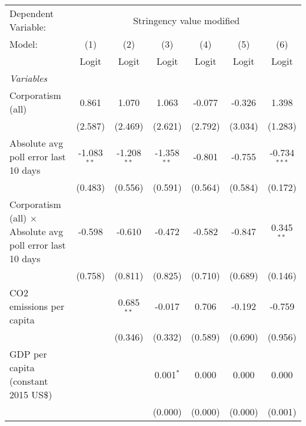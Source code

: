 
\begingroup
\centering
\begin{tabular}{lcccccc}
   \toprule
   Dependent Variable: & \multicolumn{6}{c}{Stringency value modified}\\
   Model:                                                           & (1)           & (2)           & (3)           & (4)          & (5)             & (6)\\  
                                                                    &  Logit        & Logit         & Logit         & Logit        & Logit           & Logit\\  
   \midrule
   \emph{Variables}\\
   Corporatism (all)                                                & 0.861         & 1.070         & 1.063         & -0.077       & -0.326          & 1.398\\   
                                                                    & (2.587)       & (2.469)       & (2.621)       & (2.792)      & (3.034)         & (1.283)\\   
   Absolute avg poll error last 10 days                             & -1.083$^{**}$ & -1.208$^{**}$ & -1.358$^{**}$ & -0.801       & -0.755          & -0.734$^{***}$\\   
                                                                    & (0.483)       & (0.556)       & (0.591)       & (0.564)      & (0.584)         & (0.172)\\   
   Corporatism (all) $\times$ Absolute avg poll error last 10 days  & -0.598        & -0.610        & -0.472        & -0.582       & -0.847          & 0.345$^{**}$\\   
                                                                    & (0.758)       & (0.811)       & (0.825)       & (0.710)      & (0.689)         & (0.146)\\   
   CO2 emissions per capita                                         &               & 0.685$^{**}$  & -0.017        & 0.706        & -0.192          & -0.759\\   
                                                                    &               & (0.346)       & (0.332)       & (0.589)      & (0.690)         & (0.956)\\   
   GDP per capita (constant 2015 US\$)                              &               &               & 0.001$^{*}$   & 0.000        & 0.000           & 0.000\\   
                                                                    &               &               & (0.000)       & (0.000)      & (0.000)         & (0.001)\\   

\end{tabular}

